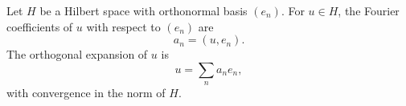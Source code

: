 Let $H$ be a Hilbert space with orthonormal basis $(e_n)$. For $u \in H$, the Fourier coefficients of $u$ with respect to $(e_n)$ are
$$a_n = (u, e_n).$$
The orthogonal expansion of $u$ is
$$u = \sum_{n} a_n e_n,$$
with convergence in the norm of $H$.
